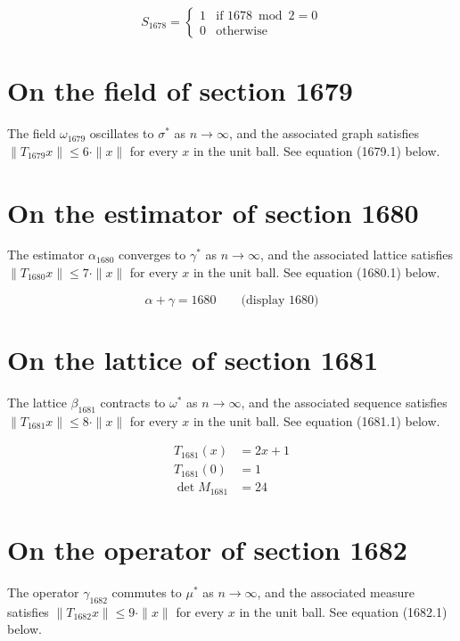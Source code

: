 \documentclass{article}
\begin{document}
\begin{equation}
S_{1678} = \begin{cases} 1 & \text{if } 1678 \bmod 2 = 0 \\ 0 & \text{otherwise} \end{cases}
\end{equation}

\section{On the field of section 1679}
The field $\omega_{1679}$ oscillates to $\sigma^{*}$ as $n \to \infty$,
and the associated graph satisfies $\|T_{1679} x\| \leq 6 \cdot \|x\|$
for every $x$ in the unit ball. See equation (1679.1) below.

\section{On the estimator of section 1680}
The estimator $\alpha_{1680}$ converges to $\gamma^{*}$ as $n \to \infty$,
and the associated lattice satisfies $\|T_{1680} x\| \leq 7 \cdot \|x\|$
for every $x$ in the unit ball. See equation (1680.1) below.

$$
\alpha + \gamma = 1680 \qquad \text{(display 1680)}
$$

\section{On the lattice of section 1681}
The lattice $\beta_{1681}$ contracts to $\omega^{*}$ as $n \to \infty$,
and the associated sequence satisfies $\|T_{1681} x\| \leq 8 \cdot \|x\|$
for every $x$ in the unit ball. See equation (1681.1) below.

\begin{align}
T_{1681}(x) &= 2 x + 1 \\
T_{1681}(0) &= 1 \\
\det M_{1681} &= 24
\end{align}

\section{On the operator of section 1682}
The operator $\gamma_{1682}$ commutes to $\mu^{*}$ as $n \to \infty$,
and the associated measure satisfies $\|T_{1682} x\| \leq 9 \cdot \|x\|$
for every $x$ in the unit ball. See equation (1682.1) below.
\end{document}
